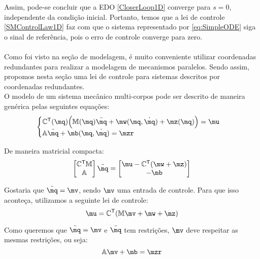 Assim, pode-se concluir que a EDO \eqref{CloserLoop1D} converge para $s=0$, independente da condi\c{c}\~ao inicial. Portanto, temos que a lei de controle \eqref{SMControlLaw1D} faz com que o sistema representado por \eqref{eq:SimpleODE} siga o sinal de refer\^encia, pois o erro de controle converge para zero. \\

\\

Como foi visto na se\c{c}\~ao de modelagem, \'e muito conveniente utilizar coordenadas redundantes para realizar a modelagem de mecanismos paralelos. Sendo assim, propomos nesta se\c{c}\~ao uma lei de controle para sistemas descritos por coordenadas redundantes. \\
 
O modelo de um sistema mec\^anico multi-corpos pode ser descrito de maneira gen\'erica pelas seguintes equa\c{c}\~oes:
\begin{equation} \label{eq:MechanicalSystem}
\begin{cases}
\mC^\msT (\mq) \Big( \mM (\mq) \ddot{\mq} + \mw (\mq, \dot{\mq}) + \mz (\mq) \Big) = \mu \\
\mA \ddot{\mq} + \mb (\mq, \dot{\mq}) = \mzr
\end{cases}
\end{equation}

De maneira matricial compacta:
\begin{equation} \label{eq:MechanicalSystemMatrix}
\begin{bmatrix}
\mC^\msT \mM \\
\mA
\end{bmatrix}
\ddot{\mq}
=
\begin{bmatrix}
\mu - \mC^\msT(\mw + \mz) \\
-\mb
\end{bmatrix}
\end{equation}

Gostaria que $ \ddot{\mq} = \mv $, sendo $\mv$ uma entrada de controle. Para que isso aconte\c{c}a, utilizamos a seguinte lei de controle:
\begin{equation} \label{eq:ControlLawV}
\mu = \mC^\msT ( \mM \mv + \mw + \mz )
\end{equation}

Como queremos que $ \ddot{\mq} = \mv $ e $\ddot{\mq}$ tem restri\c{c}\~oes, $\mv$ deve respeitar as mesmas restri\c{c}\~oes, ou seja:
\begin{equation} \label{eq:ControlLawVRestriction}
\mA \mv + \mb = \mzr
\end{equation}


